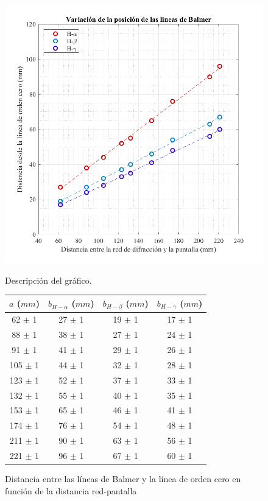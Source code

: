\documentclass{article}
\begin{document}
\begin{figure}[h]
    \begin{minipage}{0.6\textwidth}
        \centering
        \includegraphics[width=\linewidth]{Lineas_de_Balmer.png}
        \caption{Descripción del gráfico.}
        \label{fig:nombre_del_archivo}
    \end{minipage}\hfill
    \begin{minipage}{0.4\textwidth}
        \centering
        \begin{tabular}{c|ccc}
         $a$ ($mm$)& $b_{H-\alpha}$ ($mm$) & $b_{H-\beta}$ ($mm$) & $b_{H-\gamma}$ ($mm$)\\ \hline
         62 $\pm$ 1& 27  $\pm$ 1& 19  $\pm$ 1& 17 $\pm$ 1\\
         88 $\pm$ 1& 38 $\pm$ 1& 27  $\pm$ 1& 24 $\pm$ 1\\
         91 $\pm$ 1&  41 $\pm$ 1&29   $\pm$ 1&26  $\pm$ 1\\
         105 $\pm$ 1&  44 $\pm$ 1& 32  $\pm$ 1&28 $\pm$ 1 \\
         123 $\pm$ 1&  52 $\pm$ 1& 37 $\pm$ 1 & 33 $\pm$ 1\\
         132 $\pm$ 1&  55 $\pm$ 1& 40 $\pm$ 1 & 35 $\pm$ 1\\
         153 $\pm$ 1&  65 $\pm$ 1& 46 $\pm$ 1 & 41 $\pm$ 1\\
         174 $\pm$ 1&  76 $\pm$ 1& 54 $\pm$ 1 & 48 $\pm$ 1\\
         211 $\pm$ 1&  90 $\pm$ 1& 63  $\pm$ 1& 56 $\pm$ 1\\
         221 $\pm$ 1&  96 $\pm$ 1& 67 $\pm$ 1 & 60 $\pm$ 1\\
    \end{tabular}
    \caption{Distancia entre las líneas de Balmer y la línea de orden cero en función de la distancia red-pantalla}
    \label{tab:my_label}
    \end{minipage}
\end{figure}
\end{document}
